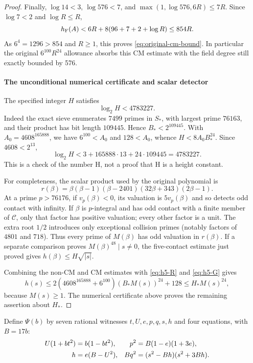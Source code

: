 \documentclass[11pt]{article}
\theoremstyle{definition}
\theoremstyle{remark}
\begin{document}
\begin{proof}
Finally, $\log14<3$, $\log576<7$, and
$\max(1,\log576,6R)\le7R$. Since $\log7<2$ and $\log R\le R$,
\[
 h_{\rm F}(A)<6R+8(96+7+2+\log R)
             \le854R.
\]
As $6^4=1296>854$ and $R\ge1$, this proves
\eqref{eq:original-cm-bound}. In particular the original
$6^{100}R^{24}$ allowance absorbs this CM estimate with the field
degree still exactly bounded by 576.

\paragraph{The unconditional numerical certificate and scalar detector}
The specified integer $H$ satisfies
\[
 \log_2H<4783227.
\]
Indeed the exact sieve enumerates $7499$ primes in $S_*$, with largest
prime $76163$, and their product has bit length $109445$. Hence
$B_*<2^{109445}$. With $A_0=4608^{165888}$, we have
$6^{100}<A_0$ and $128<A_0$, whence $H<8A_0B_*^{24}$. Since $4608<2^{13}$,
\[
 \log_2H<3+165888\cdot13+24\cdot109445=4783227.
\]
This is a check of the number H, not a proof that H is a height constant.

For completeness, the scalar product used by the original polynomial is
\[
 r(\beta)=\beta(\beta-1)(\beta-2401)(32\beta+343)(2\beta-1).
\]
At a prime $p>76176$, if $v_p(\beta)<0$, its valuation is
$5v_p(\beta)$ and so detects odd contact with infinity. If $\beta$ is
$p$-integral and has odd contact with a finite member of $\mathcal C$,
only that factor has positive valuation; every other factor is a unit.
The extra root $1/2$ introduces only exceptional collision primes
(notably factors of $4801$ and $718$). Thus every prime of $M(\beta)$ has
odd valuation in $r(\beta)$. If a separate comparison proves
$M(\beta)^{48}\mid s\ne0$, the five-contact estimate just proved gives
$h(\beta)\le H\sqrt{|s|}$.

Combining the non-CM and CM estimates with \eqref{eq:h5-R} and
\eqref{eq:h5-G} gives
\[
 h(s)\le 2(4608^{165888}+6^{100})(B_*M(s))^{24}+128
       \le H_*M(s)^{24},
\]
because $M(s)\ge1$. The numerical certificate above proves the
remaining assertion about $H_*$.
\end{proof}


Define $\Psi(b)$ by seven rational witnesses $t,U,e,p,q,s,h$ and four
equations, with $B=17b$:
\begin{align}
 U(1+bt^2)&=b(1-bt^2),&
 p^2&=B(1-e)(1+3e),\label{eq:o8-pole}\\
 h&=e(B-U^2),&
 Bq^2&=(s^2-Bh)(s^2+3Bh).\notag
\end{align}
\end{document}
